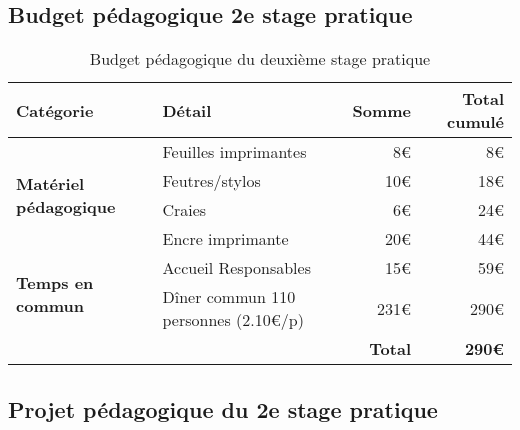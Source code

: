 \documentclass[titlepage,11pt,a4paper]{article}
\begin{document}
\clearpage
\subsection{Budget pédagogique 2e stage pratique}

\begin{table}[!ht]
   \caption{\label{budgped} Budget pédagogique du deuxième stage pratique}
   \vspace{.5em}
   \begin{adjustbox}{center}
   \begin{tabular}{llrr}
      \toprule
      \textbf{Catégorie} & \textbf{Détail} & \textbf{Somme} & \textbf{Total cumulé} \\
      \toprule
      \multirow{4}{10em}{\textbf{Matériel pédagogique}} & Feuilles imprimantes & 8€ & 8€ \\
      & Feutres/stylos & 10€ & 18€ \\
      & Craies & 6€ & 24€ \\
      & Encre imprimante & 20€ & 44€ \\
      \midrule
      \multirow{2}{10em}{\textbf{Temps en commun}} & Accueil Responsables & 15€ & 59€ \\
      & Dîner commun 110 personnes (2.10€/p) & 231€ & 290€ \\
      \bottomrule
      &  & \textbf{Total} & \textbf{290€} \\
      \bottomrule
   \end{tabular}
\end{adjustbox}
\end{table}

\clearpage
\subsection{Projet pédagogique du 2e stage pratique}
\end{document}
